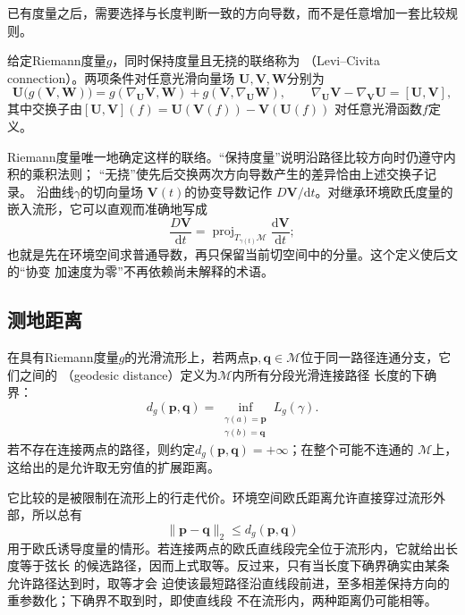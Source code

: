 已有度量之后，需要选择与长度判断一致的方向导数，而不是任意增加一套比较规则。
\begin{definition}
\label{def:geometry-levi-civita-connection}
给定Riemann度量$g$，同时保持度量且无挠的联络称为
（Levi--Civita connection）。两项条件对任意光滑向量场
$\bm U,\bm V,\bm W$分别为
\[
  \bm{U}\bigl(g(\bm{V},\bm{W})\bigr)
  =
  g(\nabla_{\bm{U}}\bm{V},\bm{W})
  +
  g(\bm{V},\nabla_{\bm{U}}\bm{W}),
  \qquad
  \nabla_{\bm{U}}\bm{V}-\nabla_{\bm{V}}\bm{U}
  =
  [\bm{U},\bm{V}],
\]
其中交换子由$[\bm U,\bm V](f)=\bm U(\bm V(f))-\bm V(\bm U(f))$
对任意光滑函数$f$定义。
\end{definition}
Riemann度量唯一地确定这样的联络。“保持度量”说明沿路径比较方向时仍遵守内积的乘积法则；
“无挠”使先后交换两次方向导数产生的差异恰由上述交换子记录。
沿曲线$\gamma$的切向量场
$\bm{V}(t)$的协变导数记作
$D\bm{V}/\mathrm{d}t$。对继承环境欧氏度量的嵌入流形，它可以直观而准确地写成
\[
  \frac{D\bm{V}}{\mathrm{d}t}
  =
  \operatorname{proj}_{T_{\gamma(t)}\mathcal{M}}
  \frac{\mathrm{d}\bm{V}}{\mathrm{d}t};
\]
也就是先在环境空间求普通导数，再只保留当前切空间中的分量。这个定义使后文的“协变
加速度为零”不再依赖尚未解释的术语。

\subsection{测地距离}

\begin{definition}[测地距离]
\label{def:geometry-geodesic-distance}
在具有Riemann度量$g$的光滑流形上，若两点$\bm{p},\bm{q}\in\mathcal{M}$位于同一路径连通分支，它们之间的
（geodesic distance）定义为$\mathcal{M}$内所有分段光滑连接路径
长度的下确界：
\begin{equation}
  d_g(\bm{p},\bm{q})
  =
  \inf_{\substack{\gamma(a)=\bm{p}\\\gamma(b)=\bm{q}}}
  L_g(\gamma).
  \label{eq:geometry-geodesic-distance}
\end{equation}
若不存在连接两点的路径，则约定$d_g(\bm{p},\bm{q})=+\infty$；在整个可能不连通的
$\mathcal{M}$上，这给出的是允许取无穷值的扩展距离。
\end{definition}
它比较的是被限制在流形上的行走代价。环境空间欧氏距离允许直接穿过流形外部，所以总有
\[
  \lVert\bm{p}-\bm{q}\rVert_2
  \leq
  d_g(\bm{p},\bm{q})
\]
用于欧氏诱导度量的情形。若连接两点的欧氏直线段完全位于流形内，它就给出长度等于弦长
的候选路径，因而上式取等。反过来，只有当长度下确界确实由某条允许路径达到时，取等才会
迫使该最短路径沿直线段前进，至多相差保持方向的重参数化；下确界不取到时，即使直线段
不在流形内，两种距离仍可能相等。

